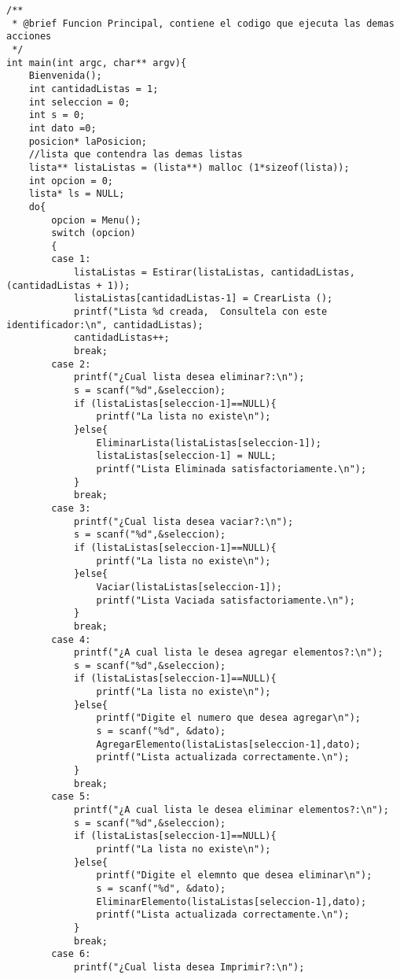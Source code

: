 \begin{verbatim}
/**
 * @brief Funcion Principal, contiene el codigo que ejecuta las demas acciones
 */
int main(int argc, char** argv){
    Bienvenida();
    int cantidadListas = 1;
    int seleccion = 0;
    int s = 0;
    int dato =0;
    posicion* laPosicion;
    //lista que contendra las demas listas
    lista** listaListas = (lista**) malloc (1*sizeof(lista));
    int opcion = 0;
    lista* ls = NULL;
    do{
        opcion = Menu();
        switch (opcion)
        {
        case 1:
            listaListas = Estirar(listaListas, cantidadListas, (cantidadListas + 1));
            listaListas[cantidadListas-1] = CrearLista ();
            printf("Lista %d creada,  Consultela con este identificador:\n", cantidadListas);
            cantidadListas++;
            break;
        case 2:
            printf("¿Cual lista desea eliminar?:\n");
            s = scanf("%d",&seleccion);
            if (listaListas[seleccion-1]==NULL){
                printf("La lista no existe\n");
            }else{
                EliminarLista(listaListas[seleccion-1]);
                listaListas[seleccion-1] = NULL;
                printf("Lista Eliminada satisfactoriamente.\n");
            }
            break;
        case 3:
            printf("¿Cual lista desea vaciar?:\n");
            s = scanf("%d",&seleccion);
            if (listaListas[seleccion-1]==NULL){
                printf("La lista no existe\n");
            }else{
                Vaciar(listaListas[seleccion-1]);
                printf("Lista Vaciada satisfactoriamente.\n");
            }
            break;
        case 4:
            printf("¿A cual lista le desea agregar elementos?:\n");
            s = scanf("%d",&seleccion);
            if (listaListas[seleccion-1]==NULL){
                printf("La lista no existe\n");
            }else{
                printf("Digite el numero que desea agregar\n");
                s = scanf("%d", &dato);
                AgregarElemento(listaListas[seleccion-1],dato);
                printf("Lista actualizada correctamente.\n");
            }
            break;
        case 5:
            printf("¿A cual lista le desea eliminar elementos?:\n");
            s = scanf("%d",&seleccion);
            if (listaListas[seleccion-1]==NULL){
                printf("La lista no existe\n");
            }else{
                printf("Digite el elemnto que desea eliminar\n");
                s = scanf("%d", &dato);
                EliminarElemento(listaListas[seleccion-1],dato);
                printf("Lista actualizada correctamente.\n");
            }
            break;
        case 6:
            printf("¿Cual lista desea Imprimir?:\n");

\end{verbatim}
